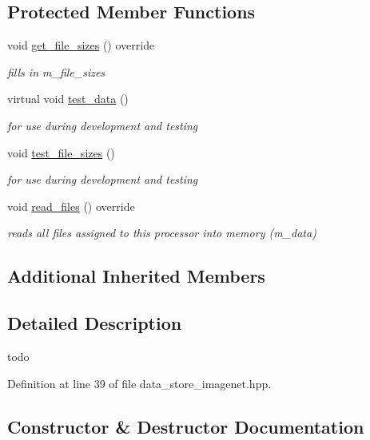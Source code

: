 \subsection*{Protected Member Functions}
\begin{DoxyCompactItemize}
\item 
void \hyperlink{classlbann_1_1data__store__imagenet_ae8f5d8741ddd762ffd3a477504bca619}{get\+\_\+file\+\_\+sizes} () override
\begin{DoxyCompactList}\small\item\em fills in m\+\_\+file\+\_\+sizes \end{DoxyCompactList}\item 
virtual void \hyperlink{classlbann_1_1data__store__imagenet_a1ed5548a409afec61489102f7f080467}{test\+\_\+data} ()
\begin{DoxyCompactList}\small\item\em for use during development and testing \end{DoxyCompactList}\item 
void \hyperlink{classlbann_1_1data__store__imagenet_a1c928ccfb4e75ffe4cefd62f37c072f8}{test\+\_\+file\+\_\+sizes} ()
\begin{DoxyCompactList}\small\item\em for use during development and testing \end{DoxyCompactList}\item 
void \hyperlink{classlbann_1_1data__store__imagenet_a70cfd8f529aad8d66993000da7350ec5}{read\+\_\+files} () override
\begin{DoxyCompactList}\small\item\em reads all files assigned to this processor into memory (m\+\_\+data) \end{DoxyCompactList}\end{DoxyCompactItemize}
\subsection*{Additional Inherited Members}


\subsection{Detailed Description}
todo 

Definition at line 39 of file data\+\_\+store\+\_\+imagenet.\+hpp.



\subsection{Constructor \& Destructor Documentation}
\mbox{\label{classlbann_1_1data__store__imagenet_a3040285850664ccecb4795df3c85fb8d}} 
